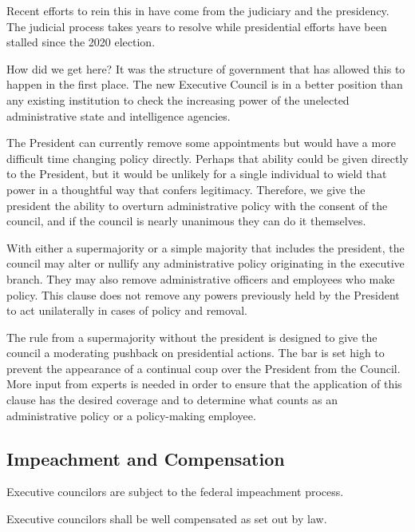 \documentclass{article}
\begin{document}
Recent efforts to rein this in have come from the judiciary\cite{Crowell} and the presidency\cite{ScheduleF}. The judicial process takes years to resolve while presidential efforts have been stalled since the 2020 election.

How did we get here? It was the structure of government that has allowed this to happen in the first place. The new Executive Council is in a better position than any existing institution to check the increasing power of the unelected administrative state and intelligence agencies.

The President can currently remove some appointments but would have a more difficult time changing policy directly\cite{Fairlie}. Perhaps that ability could be given directly to the President, but it would be unlikely for a single individual to wield that power in a thoughtful way that confers legitimacy. Therefore, we give the president the ability to overturn administrative policy with the consent of the council, and if the council is nearly unanimous they can do it themselves.

\begin{quoting}
With either a supermajority or a simple majority that includes the president, the council may alter or nullify any administrative policy originating in the executive branch. They may also remove administrative officers and employees who make policy. This clause does not remove any powers previously held by the President to act unilaterally in cases of policy and removal.
\end{quoting}

The rule from a supermajority without the president is designed to give the council a moderating pushback on presidential actions. The bar is set high to prevent the appearance of a continual coup over the President from the Council. More input from experts is needed in order to ensure that the application of this clause has the desired coverage and to determine what counts as an administrative policy or a policy-making employee.

\subsection{Impeachment and Compensation}

\begin{quoting}
Executive councilors are subject to the federal impeachment process.

Executive councilors shall be well compensated as set out by law.
\end{quoting}
\end{document}
